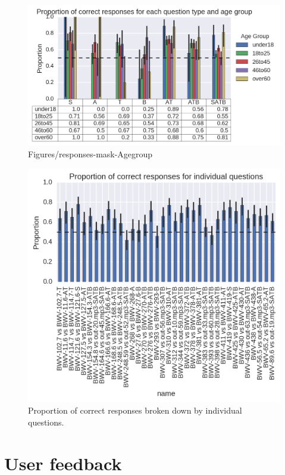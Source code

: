 \documentclass[dissertation.tex]{subfiles}
\begin{document}
\begin{figure}[htpb]
  \centering
  \includegraphics[width=1.0\textwidth]{Figures/responses-mask-agegroup.png}
  \caption{Figures/responses-mask-Agegroup}
  \label{fig:responses-mask-agegroup}
\end{figure}

\begin{figure}[htpb]
  \centering
  \includegraphics[width=0.8\linewidth]{Figures/responses-name.png}
  \caption{Proportion of correct responses broken down by individual questions.}
  \label{fig:responses-name}
\end{figure}


\section{User feedback}
\end{document}
